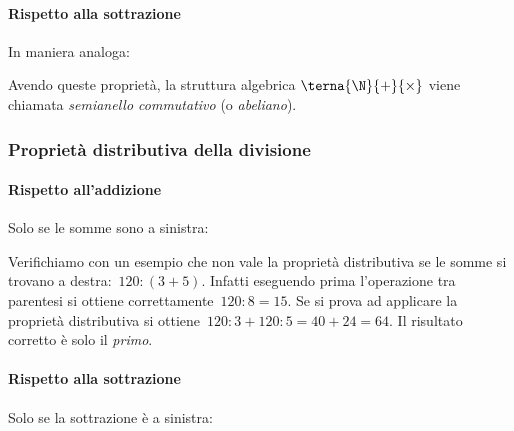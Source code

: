 \paragraph{Rispetto alla sottrazione}
In maniera analoga:


Avendo queste proprietà, la struttura algebrica 
\(\terna{\N}{+}{\times}\)\indc{\(\N\)}{\(\terna{\N}{+}{\times}\)} 
viene chiamata \emph{semianello commutativo} (o \emph{abeliano}).


\subsubsection{Proprietà distributiva della divisione}

\paragraph{Rispetto all'addizione}
Solo se le somme sono a sinistra:


Verifichiamo con un esempio che non vale la proprietà distributiva se le 
somme si trovano a destra:~\(120 : (3 + 5)\).
Infatti eseguendo prima l'operazione tra parentesi si ottiene 
correttamente~\(120 : 8 = 15\). Se si prova ad applicare
la proprietà distributiva
si ottiene~\(120 : 3 + 120 : 5 = 40 + 24 = 64\). 
Il risultato corretto è solo il \emph{primo}.

\paragraph{Rispetto alla sottrazione}
Solo se la sottrazione è a sinistra:


